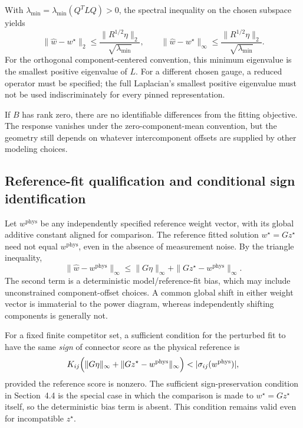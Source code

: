 With $\lambda_{\min}=\lambda_{\min}(Q^TLQ)>0$, the spectral inequality on the chosen subspace yields
\begin{equation}
\|\widehat w-w^\star\|_2
\le\frac{\|R^{1/2}\eta\|_2}{\sqrt{\lambda_{\min}}},
\qquad
\|\widehat w-w^\star\|_\infty
\le\frac{\|R^{1/2}\eta\|_2}{\sqrt{\lambda_{\min}}}.
\label{eq:reduced-spectral-bound}
\end{equation}
For the orthogonal component-centered convention, this minimum eigenvalue is the smallest positive eigenvalue of $L$. For a different chosen gauge, a reduced operator must be specified; the full Laplacian's smallest positive eigenvalue must not be used indiscriminately for every pinned representation.

If $B$ has rank zero, there are no identifiable differences from the fitting objective. The response vanishes under the zero-component-mean convention, but the geometry still depends on whatever intercomponent offsets are supplied by other modeling choices.

\subsection{Reference-fit qualification and conditional sign identification}
\label{app:stability-reference}

Let $w^{\mathrm{phys}}$ be any independently specified reference weight vector, with its global additive constant aligned for comparison. The reference fitted solution $w^\star=Gz^\star$ need not equal $w^{\mathrm{phys}}$, even in the absence of measurement noise. By the triangle inequality,
\begin{equation}
\|\widehat w-w^{\mathrm{phys}}\|_\infty
\le \|G\eta\|_\infty
+\|Gz^\star-w^{\mathrm{phys}}\|_\infty.
\label{eq:reference-fit-bias-bound}
\end{equation}
The second term is a deterministic model/reference-fit bias, which may include unconstrained component-offset choices. A common global shift in either weight vector is immaterial to the power diagram, whereas independently shifting components is generally not.

For a fixed finite competitor set, a sufficient condition for the perturbed fit to have the same \emph{sign} of connector score as the physical reference is
\begin{equation}
K_{ij}\Bigl(\|G\eta\|_\infty+
\|Gz^\star-w^{\mathrm{phys}}\|_\infty\Bigr)
<|\sigma_{ij}(w^{\mathrm{phys}})|,
\label{eq:reference-sign-condition}
\end{equation}
provided the reference score is nonzero. The sufficient sign-preservation condition in Section~4.4 is the special case in which the comparison is made to $w^\star=Gz^\star$ itself, so the deterministic bias term is absent. This condition remains valid even for incompatible $z^\star$.


